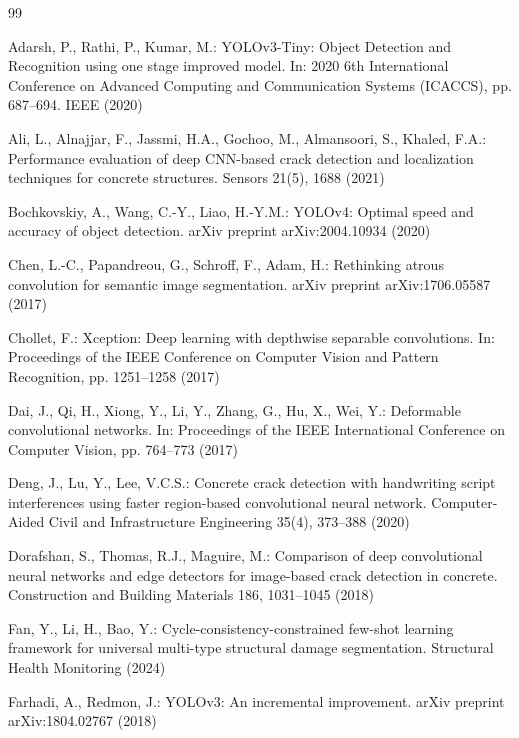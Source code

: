 \documentclass[twocolumn]{sn-jnl}
\begin{document}
	\begin{thebibliography}{99}
		
		Adarsh, P., Rathi, P., Kumar, M.: YOLOv3-Tiny: Object Detection and Recognition using one stage improved model. In: 2020 6th International Conference on Advanced Computing and Communication Systems (ICACCS), pp. 687–694. IEEE (2020)
		
		Ali, L., Alnajjar, F., Jassmi, H.A., Gochoo, M., Almansoori, S., Khaled, F.A.: Performance evaluation of deep CNN-based crack detection and localization techniques for concrete structures. Sensors 21(5), 1688 (2021)
		
		Bochkovskiy, A., Wang, C.-Y., Liao, H.-Y.M.: YOLOv4: Optimal speed and accuracy of object detection. arXiv preprint arXiv:2004.10934 (2020)
		
		Chen, L.-C., Papandreou, G., Schroff, F., Adam, H.: Rethinking atrous convolution for semantic image segmentation. arXiv preprint arXiv:1706.05587 (2017)
		
		Chollet, F.: Xception: Deep learning with depthwise separable convolutions. In: Proceedings of the IEEE Conference on Computer Vision and Pattern Recognition, pp. 1251–1258 (2017)
		
		Dai, J., Qi, H., Xiong, Y., Li, Y., Zhang, G., Hu, X., Wei, Y.: Deformable convolutional networks. In: Proceedings of the IEEE International Conference on Computer Vision, pp. 764–773 (2017)
		
		Deng, J., Lu, Y., Lee, V.C.S.: Concrete crack detection with handwriting script interferences using faster region-based convolutional neural network. Computer-Aided Civil and Infrastructure Engineering 35(4), 373–388 (2020)
		
		Dorafshan, S., Thomas, R.J., Maguire, M.: Comparison of deep convolutional neural networks and edge detectors for image-based crack detection in concrete. Construction and Building Materials 186, 1031–1045 (2018)
		
		Fan, Y., Li, H., Bao, Y.: Cycle-consistency-constrained few-shot learning framework for universal multi-type structural damage segmentation. Structural Health Monitoring (2024)
		
		Farhadi, A., Redmon, J.: YOLOv3: An incremental improvement. arXiv preprint arXiv:1804.02767 (2018)
		

\end{thebibliography}
\end{document}

